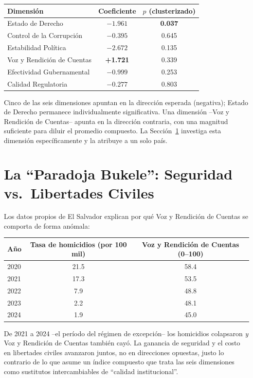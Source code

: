 \documentclass[11pt,a4paper]{article}
\begin{document}
\begin{center}
\begin{tabular}{lcc}
\toprule
Dimensión & Coeficiente & $p$ (clusterizado) \\
\midrule
Estado de Derecho & $-1.961$ & \textbf{0.037} \\
Control de la Corrupción & $-0.395$ & 0.645 \\
Estabilidad Política & $-2.672$ & 0.135 \\
Voz y Rendición de Cuentas & \textbf{+1.721} & 0.339 \\
Efectividad Gubernamental & $-0.999$ & 0.253 \\
Calidad Regulatoria & $-0.277$ & 0.803 \\
\bottomrule
\end{tabular}
\end{center}

Cinco de las seis dimensiones apuntan en la dirección esperada (negativa); Estado de Derecho permanece individualmente significativa. Una dimensión --Voz y Rendición de Cuentas-- apunta en la dirección contraria, con una magnitud suficiente para diluir el promedio compuesto. La Sección~\ref{sec:paradoja_bukele} investiga esta dimensión específicamente y la atribuye a un solo país.

\section{La ``Paradoja Bukele'': Seguridad vs.\ Libertades Civiles}
\label{sec:paradoja_bukele}

Los datos propios de El Salvador explican por qué Voz y Rendición de Cuentas se comporta de forma anómala:

\begin{center}
\begin{tabular}{lcc}
\toprule
Año & Tasa de homicidios (por 100 mil) & Voz y Rendición de Cuentas (0--100) \\
\midrule
2020 & 21.5 & 58.4 \\
2021 & 17.3 & 53.5 \\
2022 & 7.9 & 48.8 \\
2023 & 2.2 & 48.1 \\
2024 & 1.9 & 45.0 \\
\bottomrule
\end{tabular}
\end{center}

De 2021 a 2024 --el período del régimen de excepción-- los homicidios colapsaron \emph{y} Voz y Rendición de Cuentas también cayó. La ganancia de seguridad y el costo en libertades civiles avanzaron juntos, no en direcciones opuestas, justo lo contrario de lo que asume un índice compuesto que trata las seis dimensiones como sustitutos intercambiables de ``calidad institucional''.
\end{document}
